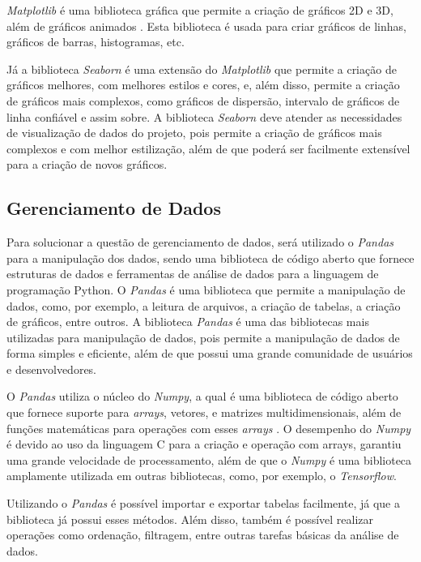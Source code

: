     \textit{Matplotlib} é uma biblioteca gráfica que permite a criação de gráficos 2D e 3D, além de gráficos animados \cite{tosi2009matplotlib}. Esta biblioteca é usada para criar gráficos de linhas, gráficos de barras, histogramas, etc.

    Já a biblioteca \textit{Seaborn} é uma extensão do \textit{Matplotlib} que permite a criação de gráficos melhores, com melhores estilos e cores, e, além disso, permite a criação de gráficos mais complexos, como gráficos de dispersão, intervalo de gráficos de linha confiável e assim sobre. A biblioteca \textit{Seaborn} deve atender as necessidades de visualização de dados do projeto, pois permite a criação de gráficos mais complexos e com melhor estilização, além de que poderá ser facilmente extensível para a criação de novos gráficos.

    \subsection{Gerenciamento de Dados}

    Para solucionar a questão de gerenciamento de dados, será utilizado o \textit{Pandas} para a manipulação dos dados, sendo uma biblioteca de código aberto que fornece estruturas de dados e ferramentas de análise de dados para a linguagem de programação Python. O \textit{Pandas} é uma biblioteca que permite a manipulação de dados, como, por exemplo, a leitura de arquivos, a criação de tabelas, a criação de gráficos, entre outros. A biblioteca \textit{Pandas} é uma das bibliotecas mais utilizadas para manipulação de dados, pois permite a manipulação de dados de forma simples e eficiente, além de que possui uma grande comunidade de usuários e desenvolvedores.

    O \textit{Pandas} utiliza o núcleo do \textit{Numpy}, a qual é uma biblioteca de código aberto que fornece suporte para \textit{arrays}, vetores, e matrizes multidimensionais, além de funções matemáticas para operações com esses \textit{arrays} \cite{pandas}. O desempenho do \textit{Numpy} é devido ao uso da linguagem C para a criação e operação com arrays, garantiu uma grande velocidade de processamento, além de que o \textit{Numpy} é uma biblioteca amplamente utilizada em outras bibliotecas, como, por exemplo, o \textit{Tensorflow}.

    Utilizando o \textit{Pandas} é possível importar e exportar tabelas facilmente, já que a biblioteca já possui esses métodos. Além disso, também é possível realizar operações como ordenação, filtragem, entre outras tarefas básicas da análise de dados.
